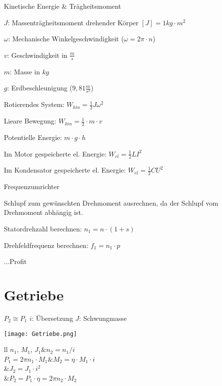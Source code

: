 \documentclass[german]{latex4ei/latex4ei_sheet}
\begin{document}
\begin{sectionbox}
			\begin{symbolbox}{Kinetische Energie \& Trägheitsmoment}
				\item $J$: Massenträgheitsmoment drehender Körper $[J] = 1kg\cdot m^2$
				\item $\omega$: Mechanische Winkelgeschwindigkeit ($\omega = 2\pi \cdot n$)
				\item $v$: Geschwindigkeit in $\frac{m}{s}$
				\item $m$: Masse in $kg$
				\item $g$: Erdbeschleunigung ($9,81\frac{m}{s^2}$)
				\item Rotierendes System: \quad $W_{kin} = \frac{1}{2}J\omega^2$
				\item Lieare Bewegung: \quad $W_{kin} = \frac{1}{2} \cdot m \cdot v$
				\item Potentielle Energie: \quad $m\cdot g\cdot h$
				\item Im Motor gespeicherte el. Energie: \quad $W_{el} = \frac{1}{2}LI^2$
				\item Im Kondensator gespeicherte el. Energie: \quad $W_{el} = \frac{1}{2}CU^2$
			\end{symbolbox}
			\begin{cookbox}{Frequenzumrichter}
				\item Schlupf zum gewünschten Drehmoment ausrechnen, da der Schlupf vom Drehmoment abhängig ist.
				\item Statordrehzahl berechnen: $n_1 = n\cdot(1+s)$
				\item Drehfeldfrequenz berechnen: $f_1 = n_1 \cdot p$
				\item ...Profit
			\end{cookbox}
	\end{sectionbox}

\section{Getriebe}
	\begin{sectionbox}

		\begin{bluebox}
		$P_2 \cong P_1$
		$i$: Übersetzung
		$J$: Schwungmasse
		\end{bluebox}
		\hspace{1.5cm} \texttt{[image: Getriebe.png]} 
			\begin{tablebox}{ll}
				$n_1$, $M_1$, $J_1$&$n_2= n_1/i$\\
				$P_1 = 2\pi n_1\cdot M_1$&$M_2=\eta\cdot M_1 \cdot i$\\
				&$J_2=J_1\cdot i^2$\\
				&$P_2=P_1\cdot \eta= 2\pi n_2\cdot M_2$\\
			\end{tablebox}
	\end{sectionbox}
\end{document}
